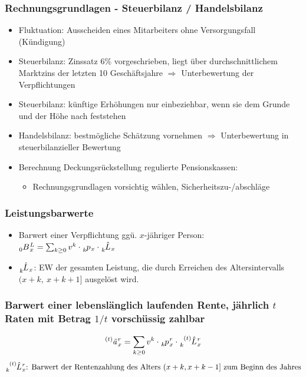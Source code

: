 \documentclass[12pt]{report}
\theoremstyle{dotless}
\theoremstyle{definition}
\begin{document}
\subsubsection{Rechnungsgrundlagen - Steuerbilanz / Handelsbilanz}
\begin{itemize}
	\item Fluktuation: Ausscheiden eines Mitarbeiters ohne Versorgungsfall (Kündigung)
	\item Steuerbilanz: Zinssatz 6$\%$ vorgeschrieben, liegt über durchschnittlichem Marktzins der letzten 10 Geschäftsjahre $\Rightarrow$ Unterbewertung der Verpflichtungen
	\item Steuerbilanz: künftige Erhöhungen nur einbeziehbar, wenn sie dem Grunde und der Höhe nach feststehen
	\item Handelsbilanz: bestmögliche Schätzung vornehmen $\Rightarrow$ Unterbewertung in steuerbilanzieller Bewertung
	\item Berechnung Deckungsrückstellung regulierte Pensionskassen:
		\begin{itemize}
			\item Rechnungsgrundlagen vorsichtig wählen, Sicherheitszu-/abschläge
		\end{itemize}
\end{itemize}

\subsubsection{Leistungsbarwerte}

\begin{itemize}
	\item Barwert einer Verpflichtung ggü. $x$-jähriger Person: $\tensor[_{0}]{B}{}_x^L=\sum_{k\geq 0}v^k \cdot \tensor[_{k}]{p}{}_x \cdot \tensor[_{k}]{\hat{L}}{}_x$
	\item $\tensor[_{k}]{\hat{L}}{}_x$: EW der gesamten Leistung, die durch Erreichen des Altersintervalls $(x+k, \ x+k+1]$ ausgelöst wird.
\end{itemize}

\subsubsection{Barwert einer lebenslänglich laufenden Rente, jährlich $t$ Raten mit Betrag $1/t$ vorschüssig zahlbar}
\begin{equation}
	\tensor[^{(t)}]{\text{\textit{ä}}}{}_x^r=\sum_{k \geq 0} v^k \cdot \tensor[_{k}]{p}{}_x^r \cdot  \tensor[_{k}^{(t)}]{\hat{L}}{}_x^r
\end{equation}
\begin{equation}
	\tensor[_{k}^{(t)}]{\hat{L}}{}_x^r \text{: Barwert der Rentenzahlung des Alters } (x+k, x+k-1] \text{ zum Beginn des Jahres}
\end{equation}
\end{document}
